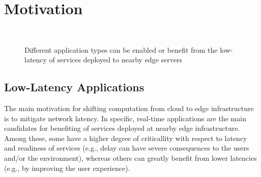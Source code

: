 \section{Motivation}\label{sec:motivation}

\begin{figure}[tbp]
	\centering
	\hfill
	~
	\hfill
	\caption{Different application types can be enabled or benefit from the low-latency of services deployed to nearby edge servers} \label{fig:motivational-cases}
\end{figure}

\subsection{Low-Latency Applications}

The main motivation for shifting computation from cloud to edge infrastructure is to mitigate network latency. In specific, real-time applications are the main candidates for benefiting of services deployed at nearby edge infrastructure. Among these, some have a higher degree of criticallity with respect to latency and readiness of services (e.g., delay can have severe consequences to the users and/or the environment), whereas others can greatly benefit from lower latencies (e.g., by improving the user experience).

